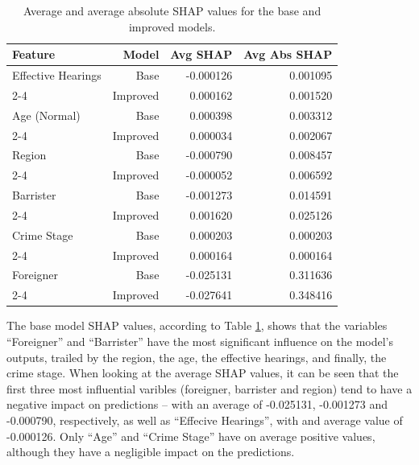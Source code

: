 \documentclass[fleqn,10pt]{wlscirep}
\begin{document}
\begin{table}[h!]
\centering
\begin{tabular}{|l|r|r|r|}
\hline
\textbf{Feature} & \textbf{Model} & \textbf{Avg SHAP} & \textbf{Avg Abs SHAP} \\ \hline
Effective Hearings & Base      & -0.000126 &  0.001095  \\ \cline{2-4}
                   & Improved  &  0.000162 &   0.001520  \\ \hline
Age (Normal)         & Base      &  0.000398 &  0.003312  \\ \cline{2-4}
                   & Improved  &  0.000034 &  0.002067  \\ \hline
Region             & Base      &  -0.000790 &  0.008457  \\ \cline{2-4}
                   & Improved  &  -0.000052 &  0.006592  \\ \hline
Barrister          & Base      & -0.001273 &  0.014591  \\ \cline{2-4}
                   & Improved  &  0.001620 &  0.025126  \\ \hline
Crime Stage        & Base      &  0.000203 &  0.000203 \\ \cline{2-4}
                   & Improved  &  0.000164 &  0.000164  \\ \hline
Foreigner          & Base      & -0.025131 &  0.311636  \\ \cline{2-4}
                   & Improved  &  -0.027641 &  0.348416  \\ \hline
\end{tabular}
\caption{Average and average absolute SHAP values for the base and improved models.}
\label{tab:dt_shap_stats_base_improved}
\end{table}

The base model SHAP values, according to Table \ref{tab:dt_shap_stats_base_improved}, shows that the variables ``Foreigner'' and ``Barrister'' have the most significant influence on the model's outputs, trailed by the region, the age, the effective hearings, and finally, the crime stage. When looking at the average SHAP values, it can be seen that the first three most influential varibles (foreigner, barrister and region) tend to have a negative impact on predictions -- with an average of -0.025131, -0.001273 and -0.000790, respectively, as well as ``Effecive Hearings'', with and average value of -0.000126. Only ``Age'' and ``Crime Stage'' have on average positive values, although they have a negligible impact on the predictions.
\end{document}
